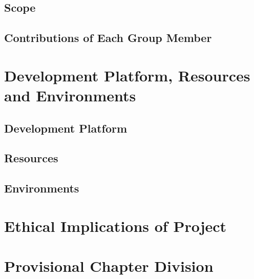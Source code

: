 \subsection{Scope}
\subsection{Contributions of Each Group Member}

\section{Development Platform, Resources and Environments}
\subsection{Development Platform}
\subsection{Resources}
\subsection{Environments}

\section{Ethical Implications of Project}

\section{Provisional Chapter Division}


